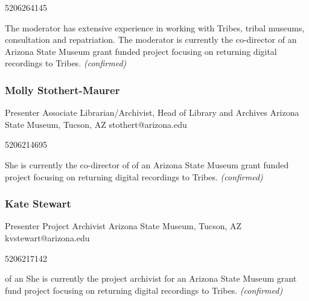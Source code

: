 \documentclass{report}
\begin{document}
                5206264145\newline

                The moderator has extensive experience in working with Tribes, tribal museums, consultation and repatriation. The moderator is currently the co-director of an Arizona State Museum grant funded project focusing on returning digital recordings to Tribes.\newline
                \emph{ (confirmed) }
              

              
                \subsubsection*{ Molly Stothert-Maurer }
                Presenter\newline
                Associate Librarian/Archivist, Head of Library and Archives\newline
                Arizona State Museum, Tucson, AZ
                \newline
                stothert@arizona.edu\newline
                
                5206214695\newline

                She is currently the co-director of of an Arizona State Museum grant funded project focusing on returning digital recordings to Tribes.
                \emph{ (confirmed) }
              

              
                \subsubsection*{ Kate Stewart }
                Presenter\newline
                Project Archivist\newline
                Arizona State Museum, Tucson, AZ
                \newline
                kvstewart@arizona.edu\newline
                
                5206217142\newline

                of an  She is currently the project archivist for an Arizona State Museum grant fund project focusing on returning digital recordings to Tribes.
                \emph{ (confirmed) }
              
\end{document}
